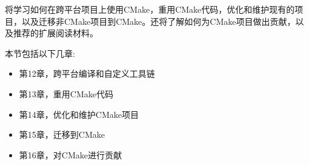 将学习如何在跨平台项目上使用CMake，重用CMake代码，优化和维护现有的项目，以及迁移非CMake项目到CMake。还将了解如何为CMake项目做出贡献，以及推荐的扩展阅读材料。

本节包括以下几章:

\begin{itemize}
\item 第12章，跨平台编译和自定义工具链
\item 第13章，重用CMake代码
\item 第14章，优化和维护CMake项目
\item 第15章，迁移到CMake
\item 第16章，对CMake进行贡献
\end{itemize}